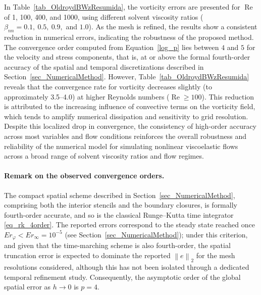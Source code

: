 \documentclass[preprint, 12pt]{elsarticle}
\begin{document}
In Table~\ref{tab_OldroydBWzResumida}, the vorticity errors are presented for $\operatorname{Re}$ of 1, 100, 400, and 1000, using different solvent viscosity ratios ($\beta_{nn} = 0.1,\ 0.5,\ 0.9,$ and $1.0$). As the mesh is refined, the results show a consistent reduction in numerical errors, indicating the robustness of the proposed method. The convergence order computed from Equation~\eqref{log_p} lies between $4$ and $5$ for the velocity and stress components, that is, at or above the formal fourth-order accuracy of the spatial and temporal discretizations described in Section~\ref{sec_NumericalMethod}. However, Table~\ref{tab_OldroydBWzResumida} reveals that the convergence rate for vorticity decreases slightly (to approximately 3.5–4.0) at higher Reynolds numbers ($\operatorname{Re} \geq 100$). This reduction is attributed to the increasing influence of convective terms on the vorticity field, which tends to amplify numerical dissipation and sensitivity to grid resolution. Despite this localized drop in convergence, the consistency of high-order accuracy across most variables and flow conditions reinforces the overall robustness and reliability of the numerical model for simulating nonlinear viscoelastic flows across a broad range of solvent viscosity ratios and flow regimes.

\paragraph{Remark on the observed convergence orders.} The compact spatial scheme described in Section~\ref{sec_NumericalMethod}, comprising both the interior stencils and the boundary closures, is formally fourth-order accurate, and so is the classical Runge--Kutta time integrator \eqref{eq_rk_4order}. The reported errors correspond to the steady state reached once $Er_{\varphi}<Er_{\infty}=10^{-5}$ (see Section~\ref{sec_NumericalMethod}); under this criterion, and given that the time-marching scheme is also fourth-order, the spatial truncation error is expected to dominate the reported $\left\|e\right\|_2$ for the mesh resolutions considered, although this has not been isolated through a dedicated temporal refinement study. Consequently, the asymptotic order of the global spatial error as $h\to0$ is $p=4$.
\end{document}
